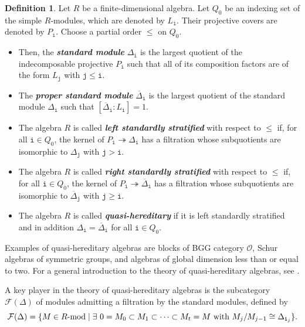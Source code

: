 \documentclass[12pt,a4paper]{amsart}
\theoremstyle{plain}
\theoremstyle{definition}
\newtheorem{defn}[thm]{Definition}
\numberwithin{equation}{thm}
\newcommand{\emphbf}[1]{\emph{\textbf{#1}}}
\newcommand{\modu}[1]{#1\hbox{-}\mathrm{mod}}
\begin{document}
\begin{defn}
Let $R$ be a finite-dimensional algebra. Let $Q_0$ be an indexing set of the simple $R$-modules, which are denoted by $L_\mathtt{i}$. Their projective covers are denoted by $P_{\mathtt{i}}$. Choose a partial order $\leq$ on $Q_0$. 
\begin{itemize}
\item Then, the \emphbf{standard module} $\Delta_\mathtt{i}$ is the largest quotient of the indecomposable projective $P_\mathtt{i}$ such that all of its composition factors are of the form $L_\mathtt{j}$ with $\mathtt{j}\leq \mathtt{i}$.
\item The \emphbf{proper standard module} $\overline{\Delta}_\mathtt{i}$ is the largest quotient of the standard module $\Delta_\mathtt{i}$ such that $[\overline{\Delta}_\mathtt{i}:L_\mathtt{i}]=1$.
\item The algebra $R$ is called \emphbf{left standardly stratified} with respect to $\leq$ if, for all $\mathtt{i} \in Q_0$, the kernel of $P_\mathtt{i}\twoheadrightarrow \Delta_\mathtt{i}$ has a filtration whose subquotients are isomorphic to $\Delta_\mathtt{j}$ with $\mathtt{j}> \mathtt{i}$.
\item The algebra $R$ is called \emphbf{right standardly stratified} with respect to $\leq$ if, for all $\mathtt{i} \in Q_0$, the kernel of $P_\mathtt{i}\twoheadrightarrow \overline{\Delta}_\mathtt{i}$ has a filtration whose subquotients are isomorphic to $\overline{\Delta}_\mathtt{j}$ with $\mathtt{j}\geq \mathtt{i}$. 
\item The algebra $R$ is called \emphbf{quasi-hereditary} if it is left standardly stratified and in addition $\Delta_\mathtt{i}=\overline{\Delta}_\mathtt{i}$ for all $\mathtt{i}\in Q_0$. 
\end{itemize}
\end{defn}



Examples of quasi-hereditary algebras are blocks of BGG category $\mathcal{O}$, Schur algebras of symmetric groups, and algebras of global dimension less than or equal to two. For a general introduction to the theory of quasi-hereditary algebras, see \cite{CPS88, DR92, KK99}. 

A key player in the theory of quasi-hereditary algebras is the subcategory $\mathcal{F}(\Delta)$ of modules admitting a filtration by the standard modules, defined by 
\[\mathcal{F}(\Delta)=\{M\in \modu{R}\mid \exists\,\, 0=M_0\subset M_1\subset \dots\subset M_t=M\text{ with }M_j/M_{j-1}\cong \Delta_{\mathtt{i}_j}\}.\]
\end{document}

